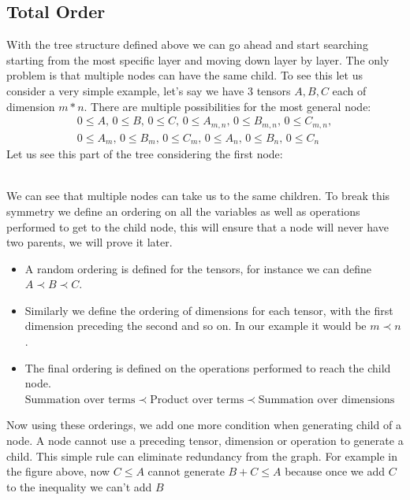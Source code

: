 \documentclass{article}
\begin{document}
\subsection{Total Order}
With the tree structure defined above we can go ahead and start searching starting from the most specific layer and moving down layer by layer. The only problem is that multiple nodes can have the same child. 
To see this let us consider a very simple example, let's say we have 3 tensors $A, B, C$ each of dimension $m*n$. There are multiple possibilities for the most general node:
\begin{multline*}
    0 \le A,\, 0 \le B,\, 0\le C,\, 
    0 \le A_{m,n},\, 0 \le B_{m,n},\, 0\le C_{m,n},\\
    0 \le A_m,\, 0 \le B_m,\, 0\le C_m,\,
    0 \le A_n,\, 0 \le B_n,\, 0\le C_n
\end{multline*}
Let us see this part of the tree considering the first node:
\\
We can see that multiple nodes can take us to the same children. To break this symmetry we define an ordering on all the variables as well as operations performed to get to the child node, this will ensure that a node will never have two parents, we will prove it later.
\begin{itemize}
    \item A random ordering is defined for the tensors, for instance we can define $A \prec B \prec C$.
    \item Similarly we define the ordering of dimensions for each tensor, with the first dimension preceding the second and so on. In our example it would be $m \prec n$.
    \item The final ordering is defined on the operations performed to reach the child node. $\text{Summation over terms} \prec \text{Product over terms} \prec \text{Summation over dimensions}$
\end{itemize}
Now using these orderings, we add one more condition when generating child of a node. A node cannot use a preceding tensor, dimension or operation to generate a child. This simple rule can eliminate redundancy from the graph. For example in the figure above, now $C\le A$ cannot generate $B+C\le A$ because once we add $C$ to the inequality we can't add $B$
\end{document}
